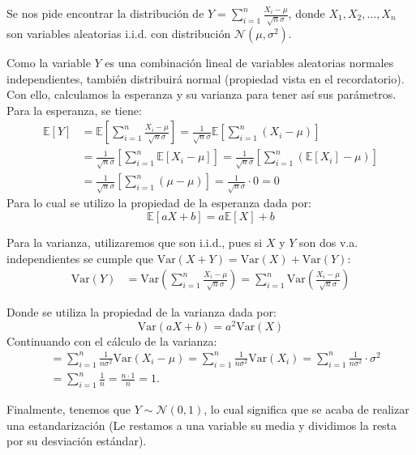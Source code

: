 \documentclass[
  11pt,
  letterpaper,
   addpoints,
  answers
  ]{exam}
\begin{document}
\begin{questions}
\begin{solution}
  Se nos pide encontrar la distribución de $Y = \sum_{i=1}^{n} \frac{X_i - \mu}{\sqrt{n}\sigma}$, donde $X_1, X_2, \ldots, X_n$ son variables aleatorias i.i.d. con distribución $\mathcal{N}(\mu, \sigma^2)$.
  
  Como la variable $Y$ es una combinación lineal de variables aleatorias normales independientes, también distribuirá normal (propiedad vista en el recordatorio). Con ello, calculamos la esperanza y su varianza para tener así sus parámetros. Para la esperanza, se tiene:
  \begin{align}
  \mathbb{E}[Y] &= \mathbb{E}\left[\sum_{i=1}^{n} \frac{X_i - \mu}{\sqrt{n}\sigma}\right] = \frac{1}{\sqrt{n}\sigma} \mathbb{E}\left[\sum_{i=1}^{n} (X_i - \mu)\right]\\
  &= \frac{1}{\sqrt{n}\sigma} \left[\sum_{i=1}^{n} \mathbb{E}[X_i - \mu]\right] = \frac{1}{\sqrt{n}\sigma} \left[\sum_{i=1}^{n} (\mathbb{E}[X_i] - \mu)\right]\\
  &= \frac{1}{\sqrt{n}\sigma} \left[\sum_{i=1}^{n} (\mu - \mu)\right] = \frac{1}{\sqrt{n}\sigma} \cdot 0 = 0
  \end{align}
  Para lo cual se utilizo la propiedad de la esperanza dada por:
  \begin{equation}
  \mathbb{E}[aX + b] = a\mathbb{E}[X] + b
  \end{equation}

  Para la varianza, utilizaremos que son i.i.d., pues si $X$ y $Y$ son dos v.a. independientes se cumple que $\text{Var}(X + Y) = \text{Var}(X) + \text{Var}(Y)$:
  \begin{align}
  \text{Var}(Y) &= \text{Var}\left(\sum_{i=1}^{n} \frac{X_i - \mu}{\sqrt{n}\sigma}\right) = \sum_{i=1}^{n} \text{Var}\left(\frac{X_i - \mu}{\sqrt{n}\sigma}\right)
  \end{align}
  
 Donde se utiliza la propiedad de la varianza dada por:
  \begin{equation}
  \text{Var}(aX + b) = a^2 \text{Var}(X)
  \end{equation}
  Continuando con el cálculo de la varianza:
  \begin{align}
  &= \sum_{i=1}^{n} \frac{1}{n\sigma^2} \text{Var}(X_i - \mu) = \sum_{i=1}^{n} \frac{1}{n\sigma^2} \text{Var}(X_i) = \sum_{i=1}^{n} \frac{1}{n\sigma^2} \cdot \sigma^2\\
  &= \sum_{i=1}^{n} \frac{1}{n} = \frac{n \cdot 1}{n} = 1.
  \end{align}
  
  Finalmente, tenemos que $Y \sim \mathcal{N}(0, 1)$, lo cual significa que se acaba de realizar una estandarización (Le restamos a una variable su media y dividimos la resta por su desviación estándar).
\end{solution}


\end{questions}
\end{document}
